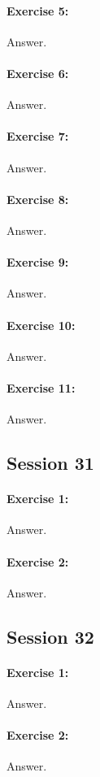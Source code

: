 \documentclass{article}
\begin{document}
\paragraph{Exercise 5:}
Answer.
\paragraph{Exercise 6:}
Answer.
\paragraph{Exercise 7:}
Answer.
\paragraph{Exercise 8:}
Answer.
\paragraph{Exercise 9:}
Answer.
\paragraph{Exercise 10:}
Answer.
\paragraph{Exercise 11:}
Answer.
\newpage

\subsection*{Session 31}
\paragraph{Exercise 1:}
Answer.
\paragraph{Exercise 2:}
Answer.
\newpage

\subsection*{Session 32}
\paragraph{Exercise 1:}
Answer.
\paragraph{Exercise 2:}
Answer.
\newpage
\end{document}
